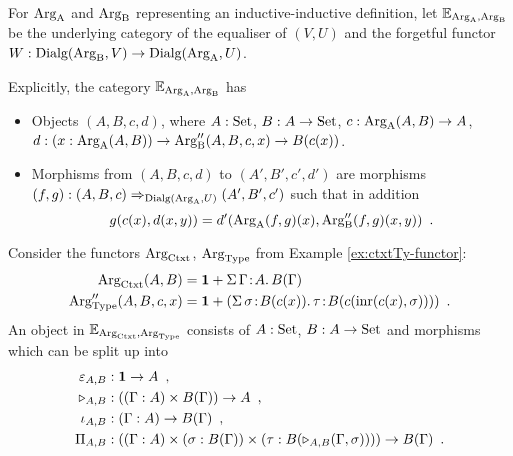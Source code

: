 \documentclass[orivec,envcountsame, ,envcountsect]{llncs}
\begin{document}

\begin{definition}
  For $\text{Arg}_{\text{A}}$ and $\text{Arg}_{\text{B}}$ representing an inductive-inductive
  definition, let $\mathbb{E}_{\text{Arg}_{\text{A}}, \text{Arg}_{\text{B}}}$ be the underlying category of
  the equaliser of $(V, U)$ and the forgetful functor ${W :
    \text{Dialg}(\text{Arg}_{\text{B}}, V) \to \text{Dialg}(\text{Arg}_{\text{A}}, U)}$.
\end{definition}
Explicitly, the category $\mathbb{E}_{\text{Arg}_{\text{A}}, \text{Arg}_{\text{B}}}$ has
\begin{itemize}
\item Objects $(A, B, c, d)$, where $A : \text{Set}$, $B : A \to \text{Set}$, $c : \text{Arg}_{\text{A}}(A, B) \to A$, $d : (x : \text{Arg}_{\text{A}}(A, B)) \to \text{Arg}_{\text{B}}''(A, B, c, x) \to B(c(x))$.
\item Morphisms from $(A, B, c, d)$ to $(A', B', c', d')$ are morphisms \\ $(f, g) :
  (A, B, c) \Rightarrow_{\text{Dialg}(\text{Arg}_{\text{A}}, U)} (A', B', c')$ such that in addition
  \[
  g(c(x), d(x, y)) = d'(\text{Arg}_{\text{A}}(f,g)(x), \text{Arg}_{\text{B}}''(f,g)(x, y)) \enspace .
  \]
\end{itemize}


\begin{example}
  Consider the functors $\text{Arg}_{\text{Ctxt}}$, $\text{Arg}_{\text{Type}}$ from Example \ref{ex:ctxtTy-functor}:
\begin{align*}
  \text{Arg}_{\text{Ctxt}}(A, B) &= \mathbf{1} + \Sigma\, \Gamma\!:\!A .\, B(\Gamma)\\
  \text{Arg}_{\text{Type}}''(A, B, c, x) &= \mathbf{1} + (\Sigma\,  \sigma\!:\! B(c(x)).\, \tau\!:\!B(c(\text{inr}(c(x), \sigma))) ) \enspace .
\end{align*}
An object in $\mathbb{E}_{\text{Arg}_{\text{Ctxt}}, \text{Arg}_{\text{Type}}}$ consists of $A : \text{Set}$, $B :
A \to \text{Set}$ and morphisms which can be split up into %
\begin{align*}
  \varepsilon_{A,B} &: \mathbf{1} \to A \enspace , \\
  \triangleright_{A,B} &: ((\Gamma : A) \times B(\Gamma)) \to A  \enspace , \\
\iota_{A,B} &: (\Gamma : A) \to B(\Gamma) \enspace , \\
\Pi_{A,B} &: ((\Gamma : A) \times  (\sigma : B(\Gamma)) \times (\tau : B(\triangleright_{A,B}(\Gamma, \sigma)))) \to B(\Gamma) \enspace.
\end{align*}
\end{example}
\end{document}
